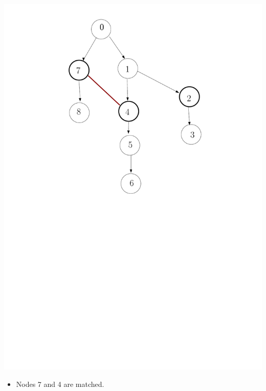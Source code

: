 \documentclass[12pt]{beamer}
\begin{document}
\begin{frame}[plain]
  \includegraphics[scale=0.3]{firstMatch.pdf}
  \begin{itemize}
  \item Nodes 7 and 4 are matched.
  \end{itemize}
\end{frame}
\end{document}
